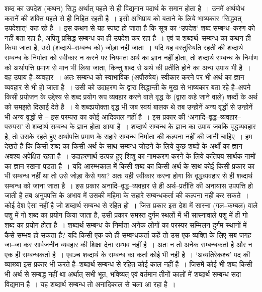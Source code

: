 शब्द का उपदेश (कथन) सिद्ध अर्थात् पहले से ही विद्यमान पदार्थ के समान होता है~। उनमें अर्थबोध करानें की शक्ति पहले से ही निहित रहती है~। इसी अभिप्राय को बताने के लिये भाष्यकार ‘सिद्धवत् उपदेशात्' कह रहे है~। इस कथन से यह स्पष्ट हो जाता है कि सूत्र का ‘उपदेश' शब्द सम्बन्ध–करण को नहीं बता रहा है, अपितु प्रसिद्ध सम्बन्ध का ही उपदेश कर रहा है~। एवं च शब्दार्थ–सम्बन्ध का कथन ही किया जाता है, उसे (शब्दार्थ–सम्बन्ध को) जोड़ा नही जाता~। यदि यह वस्तुस्थिति रहती की शब्दार्थ सम्बन्ध के निर्माता को स्वीकार न करने पर नियमतः अर्थ का ज्ञान नहीं होता, तो शब्दार्थ सम्बन्ध के निर्माण को अर्थापत्ति प्रमाण से मान भी लिया जाता, किन्तु शब्द से अर्थ की प्रतीति होने का अन्य उपाय भी है~। वह उपाय है–व्यवहार~। अतः सम्बन्ध को स्वाभाविक (अपौरुषेय) स्वीकार करने पर भी अर्थ का ज्ञान व्यवहार से भी हो जाता है~। उसी को उदाहरण के द्वारा सिद्धान्ती के मुख से भाष्यकार बता रहे है–अपने किसी प्रयोजन के उद्देश्य से शब्द प्रयोग रूप व्यवहार करने वाले वृद्ध के (द्वारा कहे जाने वाले) शब्दों के अर्थ को समझते दिखाई देते है~। ये शब्दप्रयोक्ता वृद्ध भी जब स्वयं बालक थे तब उन्होनें अन्य वृद्धों से उन्होनें भी अन्य वृद्धों से – इस परम्परा का कोई आदिकाल नहीं है~। इस प्रकार की ‘अनादि–वृद्ध–व्यवहार–परम्परा' से शब्दार्थ सम्बन्ध के ज्ञान होता आया है~। शब्दार्थ सम्बन्ध के ज्ञान का उपाय जबकि वृद्धव्यवहार है, तो उसके रहते हुए अर्थापत्ति प्रमाण के सहारे सम्बन्ध निर्माता की कल्पना नहीं की जानी चाहिए~। हम देखते है कि किसी शब्द का किसी अर्थ के साथ सम्बन्ध जोड़ने के लिये कुछ शब्दों के अर्थों का ज्ञान अवश्य अपेक्षित रहता है~। उदाहरणार्थ उत्पन्न हुए शिशु का नामकरण करने के लिये कतिपय सार्थक नामों का ज्ञान रखना पड़ता है~। यदि आरम्भकाल में किसी शब्द का किसी अर्थ के साथ कोई किसी प्रकार का भी सम्बन्ध नहीं था तो उसे जोड़ा कैसे गया? अतः यही स्वीकार करना होगा कि वृद्धव्यवहार से ही शब्दार्थ सम्बन्ध को जाना जाता है~। इस प्रकार अनादि–वृद्ध–व्यवहार से ही अर्थ–प्रतीति की अनायास उपपत्ति हो जाती है तब अनुपपत्ति के अभाव में उसकी महिमा के सहारे सम्बन्धकर्ता की कल्पना नहीं कर सकते~। कोई देश ऐसा नहीं है जो शब्दार्थ सम्बन्ध से रहित हो~। जिस प्रकार इस देश में सास्ना (गल–कम्बल) वाले पशु में गो शब्द का प्रयोग किया जाता है, उसी प्रकार समस्त दुर्गम स्थलों में भी सास्नावाले पशु में ही गो शब्द का प्रयोग होता है~। शब्दार्थ सम्बन्ध के निर्माता अनेक लोगों का परस्पर सम्मिलन दुर्गम स्थानों में कैसे सम्भव हो सकता है? यदि किसी एक को ही सम्बन्धकर्ता कहें तो उस एक व्यक्ति के लिए सब जगह जा–जा कर सार्वजनीन व्यवहार की शिक्षा देना सम्भव नहीं है~। अतः न तो अनेक सम्बन्धकर्ता है और न एक ही सम्बन्धकर्ता है~। एवञ्च शब्दार्थ के सम्बन्ध का कर्ता कोई भी नही है~। ‘अव्यतिरेकश्च' पद की व्याख्या इस प्रकार भी करते है–शब्दार्थ सम्बन्ध से रहित कोई काल नहीं है~। जिसमें कोई भी शब्द किसी भी अर्थ से सम्बद्ध नहीं था अर्थात् सभी भूत, भविष्यत् एवं वर्तमान तीनों कालों में शब्दार्थ सम्बन्ध सदा विद्यमान है~। यह शब्दार्थ सम्बन्ध तो अनादिकाल से चला आ रहा है~।

